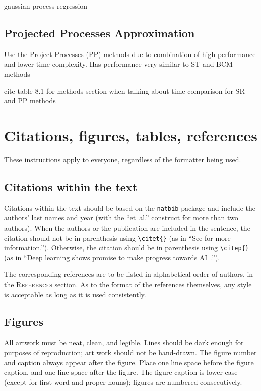 \documentclass{article}
\begin{document}
    gaussian process regression
    
    \subsection{Projected Processes Approximation}
    
    Use the Project Processes (PP) methods due to combination of high performance and lower
    time complexity. Has performance very similar to ST and BCM methods
    
    cite table 8.1 for methods section when talking about time comparison for SR and PP methods

    \section{Citations, figures, tables, references}

    These instructions apply to everyone, regardless of the formatter being used.

    \subsection{Citations within the text}

    Citations within the text should be based on the \texttt{natbib} package
    and include the authors' last names and year (with the ``et~al.'' construct
    for more than two authors). When the authors or the publication are
    included in the sentence, the citation should not be in parenthesis using \verb|\citet{}| (as
    in ``See \citet{Hinton06} for more information.''). Otherwise, the citation
    should be in parenthesis using \verb|\citep{}| (as in ``Deep learning shows promise to make progress
    towards AI~\citep{Bengio+chapter2007}.'').

    The corresponding references are to be listed in alphabetical order of
    authors, in the \textsc{References} section. As to the format of the
    references themselves, any style is acceptable as long as it is used
    consistently.

    \subsection{Figures}

    All artwork must be neat, clean, and legible. Lines should be dark
    enough for purposes of reproduction; art work should not be
    hand-drawn. The figure number and caption always appear after the
    figure. Place one line space before the figure caption, and one line
    space after the figure. The figure caption is lower case (except for
    first word and proper nouns); figures are numbered consecutively.
\end{document}
